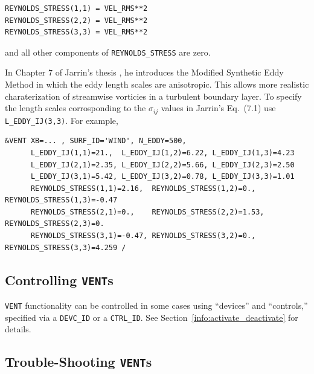\documentclass[11pt]{book}
\newcommand{\ct}{\tt\small}
\begin{document}
\footnotesize
\begin{verbatim}
REYNOLDS_STRESS(1,1) = VEL_RMS**2
REYNOLDS_STRESS(2,2) = VEL_RMS**2
REYNOLDS_STRESS(3,3) = VEL_RMS**2
\end{verbatim} \normalsize

\noindent and all other components of {\ct REYNOLDS\_STRESS} are zero.

In Chapter 7 of Jarrin's thesis \cite{Jarrin:2008}, he introduces the Modified Synthetic Eddy Method in which the eddy length scales are anisotropic.  This allows more realistic charaterization of streamwise vorticies in a turbulent boundary layer.  To specify the length scales corrosponding to the $\sigma_{ij}$ values in Jarrin's Eq.~(7.1) use {\ct L\_EDDY\_IJ(3,3)}.  For example,

\footnotesize
\begin{verbatim}
&VENT XB=... , SURF_ID='WIND', N_EDDY=500,
      L_EDDY_IJ(1,1)=21.,  L_EDDY_IJ(1,2)=6.22, L_EDDY_IJ(1,3)=4.23
      L_EDDY_IJ(2,1)=2.35, L_EDDY_IJ(2,2)=5.66, L_EDDY_IJ(2,3)=2.50
      L_EDDY_IJ(3,1)=5.42, L_EDDY_IJ(3,2)=0.78, L_EDDY_IJ(3,3)=1.01
      REYNOLDS_STRESS(1,1)=2.16,  REYNOLDS_STRESS(1,2)=0.,   REYNOLDS_STRESS(1,3)=-0.47
      REYNOLDS_STRESS(2,1)=0.,    REYNOLDS_STRESS(2,2)=1.53, REYNOLDS_STRESS(2,3)=0.
      REYNOLDS_STRESS(3,1)=-0.47, REYNOLDS_STRESS(3,2)=0.,   REYNOLDS_STRESS(3,3)=4.259 /
\end{verbatim} \normalsize

\subsection{\texorpdfstring{{Controlling {\tt VENT}s}}{Controlling VENTs}}

{\ct VENT} functionality can be controlled in some cases using ``devices'' and ``controls,'' specified via a {\ct DEVC\_ID} or a {\ct CTRL\_ID}.
See Section~\ref{info:activate_deactivate} for details.

\subsection{\texorpdfstring{{Trouble-Shooting {\tt VENT}s}}{Trouble-Shooting VENTs}}
\label{info:VENT_Trouble}
\end{document}
